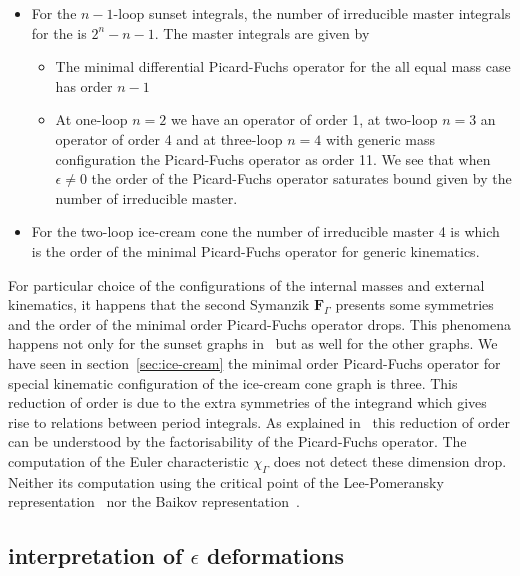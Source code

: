 \documentclass[a4paper,12pt]{article}
\numberwithin{equation}{section}
\numberwithin{figure}{section}
\begin{document}
\begin{itemize}
\item  For the $n-1$-loop
  sunset integrals, the number of irreducible master integrals for the
  is $2^{n}-n-1$.  The master integrals are given by
  
\begin{itemize}  \item The minimal differential Picard-Fuchs operator for the all
    equal mass case has order  $n-1$
  \item At one-loop $n=2$ we have an operator of order 1, at two-loop
    $n=3$ an operator of order 4 and at three-loop $n=4$ with generic
    mass configuration the Picard-Fuchs operator
as   order 11.  We see that when $\epsilon\neq0$  the order of the
    Picard-Fuchs operator saturates bound given by the number of
    irreducible master.
  \end{itemize}
  \item For the two-loop ice-cream cone the number of irreducible
    master 4 is which is the order of the minimal Picard-Fuchs
    operator for generic kinematics.
  \end{itemize}

For particular choice of the configurations of the internal masses and
external kinematics, it happens that the second Symanzik
$\textbf{F}_\Gamma$ presents some symmetries and the order of the
minimal order Picard-Fuchs operator drops.  This phenomena happens not
only for  the sunset graphs
in~\cite{Bloch:2014qca,Lairez:2022zkj,Bonisch:2021yfw,Bonisch:2020qmm,Pogel:2022vat}
but as well for the other graphs. We have seen in section~\ref{sec:ice-cream} the minimal order Picard-Fuchs
operator for special kinematic configuration of the ice-cream cone
graph is three.
This reduction of order is due to the extra symmetries of the
integrand which gives rise to relations between period integrals.
As explained in~\cite{Lairez:2022zkj} this reduction of order can be
understood by the factorisability of the Picard-Fuchs operator.  The
computation of the Euler characteristic $\chi_\Gamma$ does not detect
these dimension drop. Neither its computation using the critical point
of the
Lee-Pomeransky representation~\cite{Lee:2013hzt}   nor the
Baikov representation~\cite{Frellesvig:2017aai,Frellesvig:2019uqt,Cacciatori:2021nli}.

\subsection{interpretation of $\epsilon$ deformations}
\end{document}
